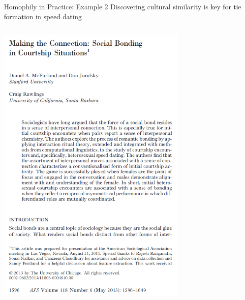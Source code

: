 \documentclass[notes, aspectratio=1610]{beamer}
\begin{document}
\begin{frame}{Homophily in Practice: Example 2}
	{Discovering cultural similarity is key for tie formation in speed dating}
	\begin{columns}[t]
		\begin{column}{0.5\textwidth}
			\centering
			\includegraphics[width=0.7\textwidth]{images/mcfarland_et_al.png}


\end{column}
\end{columns}
\end{frame}
\end{document}
